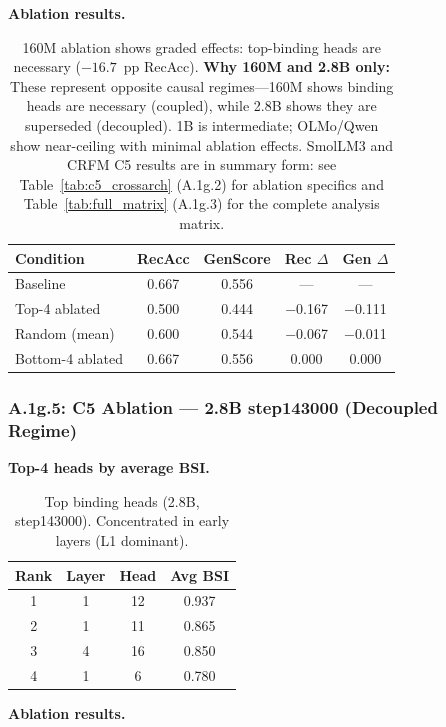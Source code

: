 \documentclass[10pt]{article} %
\begin{document}
\noindent\textbf{Ablation results.}\mbox{}

\begin{table}[H]
\centering
\small
\begin{tabular}{|l|c|c|c|c|}
\hline
\textbf{Condition} & \textbf{RecAcc} & \textbf{GenScore} & \textbf{Rec $\Delta$} & \textbf{Gen $\Delta$} \\
\hline
Baseline & 0.667 & 0.556 & --- & --- \\
Top-4 ablated & 0.500 & 0.444 & $-$0.167 & $-$0.111 \\
Random (mean) & 0.600 & 0.544 & $-$0.067 & $-$0.011 \\
Bottom-4 ablated & 0.667 & 0.556 & 0.000 & 0.000 \\
\hline
\end{tabular}
\caption{160M ablation shows graded effects: top-binding heads are necessary ($-16.7$~pp RecAcc). \textbf{Why 160M and 2.8B only:} These represent opposite causal regimes---160M shows binding heads are necessary (coupled), while 2.8B shows they are superseded (decoupled). 1B is intermediate; OLMo/Qwen show near-ceiling with minimal ablation effects. SmolLM3 and CRFM C5 results are in summary form: see Table~\ref{tab:c5_crossarch} (A.1g.2) for ablation specifics and Table~\ref{tab:full_matrix} (A.1g.3) for the complete analysis matrix.}
\end{table}

\subsubsection*{A.1g.5: C5 Ablation --- 2.8B step143000 (Decoupled Regime)}\label{sec:a1g5_2b8}

\noindent\textbf{Top-4 heads by average BSI.}\mbox{}

\begin{table}[ht]
\centering
\small
\begin{tabular}{|c|c|c|c|}
\hline
\textbf{Rank} & \textbf{Layer} & \textbf{Head} & \textbf{Avg BSI} \\
\hline
1 & 1 & 12 & 0.937 \\
2 & 1 & 11 & 0.865 \\
3 & 4 & 16 & 0.850 \\
4 & 1 & 6 & 0.780 \\
\hline
\end{tabular}
\caption{Top binding heads (2.8B, step143000). Concentrated in early layers (L1 dominant).}
\end{table}

\noindent\textbf{Ablation results.}\mbox{}
\end{document}

